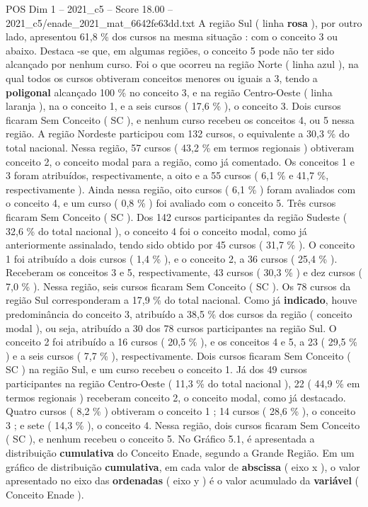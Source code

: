 \begin{textsample}{POS Dim 1 – 2021\_c5 – Score 18.00 – 2021\_c5/enade\_2021\_mat\_6642fe63dd.txt}
A região Sul ( linha \textbf{rosa} ), por outro lado, apresentou 61,8 \% dos cursos na mesma situação : com o conceito 3 ou abaixo.
Destaca -se que, em algumas regiões, o conceito 5 pode não ter sido alcançado por nenhum curso.
Foi o que ocorreu na região Norte ( linha azul ), na qual todos os cursos obtiveram conceitos menores ou iguais a 3, tendo a \textbf{poligonal} alcançado 100 \% no conceito 3, e na região Centro-Oeste ( linha laranja ), na o conceito 1, e a seis cursos ( 17,6 \% ), o conceito 3.
Dois cursos ficaram Sem Conceito ( SC ), e nenhum curso recebeu os conceitos 4, ou 5 nessa região.
A região Nordeste participou com 132 cursos, o equivalente a 30,3 \% do total nacional.
Nessa região, 57 cursos ( 43,2 \% em termos regionais ) obtiveram conceito 2, o conceito modal para a região, como já comentado.
Os conceitos 1 e 3 foram atribuídos, respectivamente, a oito e a 55 cursos ( 6,1 \% e 41,7 \%, respectivamente ).
Ainda nessa região, oito cursos ( 6,1 \% ) foram avaliados com o conceito 4, e um curso ( 0,8 \% ) foi avaliado com o conceito 5.
Três cursos ficaram Sem Conceito ( SC ).
Dos 142 cursos participantes da região Sudeste ( 32,6 \% do total nacional ), o conceito 4 foi o conceito modal, como já anteriormente assinalado, tendo sido obtido por 45 cursos ( 31,7 \% ).
O conceito 1 foi atribuído a dois cursos ( 1,4 \% ), e o conceito 2, a 36 cursos ( 25,4 \% ).
Receberam os conceitos 3 e 5, respectivamente, 43 cursos ( 30,3 \% ) e dez cursos ( 7,0 \% ).
Nessa região, seis cursos ficaram Sem Conceito ( SC ).
Os 78 cursos da região Sul corresponderam a 17,9 \% do total nacional.
Como já \textbf{indicado}, houve predominância do conceito 3, atribuído a 38,5 \% dos cursos da região ( conceito modal ), ou seja, atribuído a 30 dos 78 cursos participantes na região Sul.
O conceito 2 foi atribuído a 16 cursos ( 20,5 \% ), e os conceitos 4 e 5, a 23 ( 29,5 \% ) e a seis cursos ( 7,7 \% ), respectivamente.
Dois cursos ficaram Sem Conceito ( SC ) na região Sul, e um curso recebeu o conceito 1.
Já dos 49 cursos participantes na região Centro-Oeste ( 11,3 \% do total nacional ), 22 ( 44,9 \% em termos regionais ) receberam conceito 2, o conceito modal, como já destacado.
Quatro cursos ( 8,2 \% ) obtiveram o conceito 1 ; 14 cursos ( 28,6 \% ), o conceito 3 ; e sete ( 14,3 \% ), o conceito 4.
Nessa região, dois cursos ficaram Sem Conceito ( SC ), e nenhum recebeu o conceito 5.
No Gráfico 5.1, é apresentada a distribuição \textbf{cumulativa} do Conceito Enade, segundo a Grande Região.
Em um gráfico de distribuição \textbf{cumulativa}, em cada valor de \textbf{abscissa} ( eixo x ), o valor apresentado no eixo das \textbf{ordenadas} ( eixo y ) é o valor acumulado da \textbf{variável} ( Conceito Enade ).

\end{textsample}
